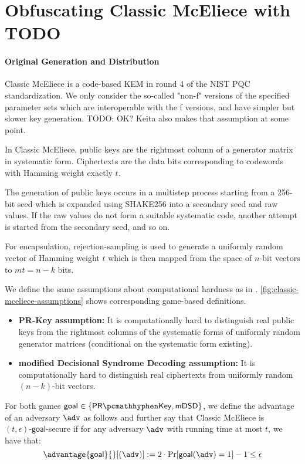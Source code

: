 \section{Obfuscating Classic McEliece with TODO} \label{sec:obfuscating-classic-mceliece}

\paragraph{Original Generation and Distribution}
Classic McEliece \cite{NISTPQC-R4:ClassicMcEliece22} is a code-based KEM in round 4 of the NIST PQC standardization. We only consider the so-called "non-f" versions of the specified parameter sets which are interoperable with the f versions, and have simpler but slower key generation. TODO: OK? Keita also makes that assumption at some point.

In Classic McEliece, public keys are the rightmost column of a generator matrix in systematic form. Ciphertexts are the data bits corresponding to codewords with Hamming weight exactly $t$.

The generation of public keys occurs in a multistep process starting from a 256-bit seed which is expanded using SHAKE256 into a secondary seed and raw values. If the raw values do not form a suitable systematic code, another attempt is started from the secondary seed, and so on.

For encapsulation, rejection-sampling is used to generate a uniformly random vector of Hamming weight $t$ which is then mapped from the space of $n$-bit vectors to $mt=n-k$ bits.

We define the same assumptions about computational hardness as in \cite[Definition~K.1]{EC:Xagawa22}. \cref{fig:classic-mceliece-assumptions} shows corresponding game-based definitions.
\begin{itemize}
    \item \textbf{PR-Key assumption:} It is computationally hard to distinguish real public keys from the rightmost columns of the systematic forms of uniformly random generator matrices (conditional on the systematic form existing).
    \item \textbf{modified Decisional Syndrome Decoding assumption:} It is computationally hard to distinguish real ciphertexts from uniformly random $(n-k)$-bit vectors.
\end{itemize}

For both games $\textsf{goal} \in \{\prkey, \mdsd\}$, we define the advantage of an adversary $\adv$ as follows and further say that Classic McEliece is $(t, \epsilon)\textsf{-goal}$-secure if for any adversary $\adv$ with running time at most $t$, we have that:
\[ \advantage{\textsf{goal}}{}[(\adv)] := 2 \cdot \Pr[\textsf{goal}(\adv) = 1] - 1 \leq \epsilon \]

